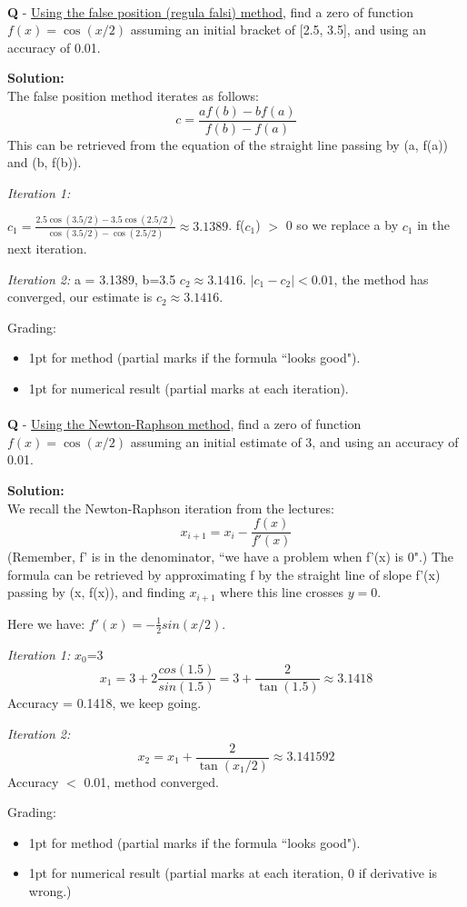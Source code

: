 \documentclass{llncs}
\newcounter{ques}
\renewcommand{\question}[1]{\paragraph{}\textbf{Q\theques} - #1\stepcounter{ques} }
\newcommand{\answer}[1]{\color{red}\textbf{Solution:}\\#1\color{black}}
\begin{document}
\newpage
\question{\underline{Using the false position (regula falsi) method}, find a zero of function $f(x)=\cos(x/2)$ assuming an initial bracket of [2.5, 3.5],
and using an accuracy of 0.01.}

\answer{
The false position method iterates as follows:
$$
c = \frac{af(b)-bf(a)}{f(b)-f(a)}
$$
This can be retrieved from the equation of the straight line passing by (a, f(a)) and (b, f(b)).

\emph{Iteration 1:}

$c_1 = \frac{2.5\cos(3.5/2)-3.5\cos(2.5/2)}{\cos(3.5/2)-\cos(2.5/2)} \approx 3.1389$.
f($c_1$) $>$ 0 so we replace a by $c_1$ in the next iteration.

\emph{Iteration 2:} a = 3.1389, b=3.5
$c_2 \approx 3.1416$.
$|c_1 - c_2| < 0.01$, the method has converged, our estimate is $c_2 \approx 3.1416$.

Grading:
\begin{itemize}
\item 1pt for method (partial marks if the formula ``looks good").
\item 1pt for numerical result (partial marks at each iteration).
\end{itemize}
}

\newpage
\question{\underline{Using the Newton-Raphson method}, find a zero of function $f(x)=\cos(x/2)$ assuming an initial estimate of 3,
and using an accuracy of 0.01.}

\answer{We recall the Newton-Raphson iteration from the lectures:
$$
x_{i+1} = x_i - \frac{f(x)}{f'(x)}
$$
(Remember, f' is in the denominator, ``we have a problem when f'(x) is 
0".) The formula can be retrieved by approximating f by the straight 
line of slope f'(x) passing by (x, f(x)), and finding $x_{i+1}$ where 
this line crosses $y=0$.

Here we have: $f'(x) = -\frac{1}{2}sin(x/2)$.

\emph{Iteration 1:} $x_0$=3
$$
x_1 = 3 + 2\frac{cos(1.5)}{sin(1.5)} = 3 + \frac{2}{\tan(1.5)} \approx 3.1418
$$
Accuracy = 0.1418, we keep going.

\emph{Iteration 2:}
$$
x_2 = x_1 + \frac{2}{\tan(x_1/2)} \approx 3.141592
$$
Accuracy $<$ 0.01, method converged.

Grading:
\begin{itemize}
\item 1pt for method (partial marks if the formula ``looks good").
\item 1pt for numerical result (partial marks at each iteration, 0 if derivative is wrong.)
\end{itemize}
}
\end{document}
